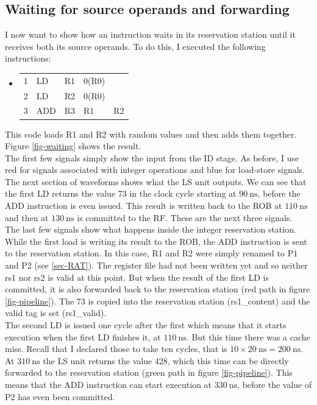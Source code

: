 \documentclass[12pt,a4paper]{article} %
\newenvironment {assembly}{\begingroup \ttfamily \color{Gray} \begin{itemize} \item[]}{\end{itemize}\endgroup}
\begin{document}
\subsection{Waiting for source operands and forwarding}
I now want to show how an instruction waits in its reservation station until it receives both its source operands. To do this, I executed the following instructions:
\begin{assembly}
	\begin{tabularx} {\textwidth} {n o a a X}
		1 & LD  & R1 & 0(R0)	& \\
		2 & LD  & R2 & 0(R0)	& \\
		3 & ADD & R3 & R1		& R2\\
	\end{tabularx}%
\end{assembly}%
This code loads R1 and R2 with random values and then adds them together. Figure \ref{fig-waiting} shows the result. \\
The first few signals simply show the input from the ID stage. As before, I use red for signals associated with integer operations and blue for load-store signals. The next section of waveforms shows what the LS unit outputs. We can see that the first LD returns the value 73 in the clock cycle starting at $\SI{90}{\ns}$, before the ADD instruction is even issued. This result is written back to the ROB at $\SI{110}{\ns}$ and then at $\SI{130}{\ns}$ is committed to the RF. These are the next three signals. \\
The last few signals show what happens inside the integer reservation station. While the first load is writing its result to the ROB, the ADD instruction is sent to the reservation station. In this case, R1 and R2 were simply renamed to P1 and P2 (see \ref{sec-RAT}). The register file had not been written yet and so neither rs1 nor rs2 is valid at this point. But when the result of the first LD is committed, it is also forwarded back to the reservation station (red path in figure \ref{fig-pipeline}). The 73 is copied into the reservation station (rs1\_content) and the valid tag is set (rs1\_valid).\\
The second LD is issued one cycle after the first which means that it starts execution when the first LD finishes it, at $\SI{110}{\ns}$. But this time there was a cache miss. Recall that I declared those to take ten cycles, that is $10 \times \SI{20}{\ns} = \SI{200}{\ns}$. At $\SI{310}{\ns}$ the LS unit returns the value 428, which this time can be directly forwarded to the reservation station (green path in figure \ref{fig-pipeline}). This means that the ADD instruction can start execution at $\SI{330}{\ns}$, before the value of P2 has even been committed.\\
\end{document}
